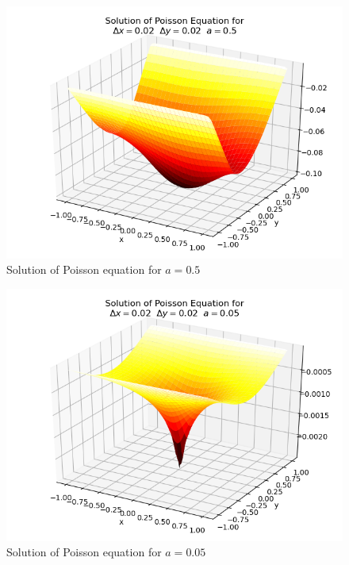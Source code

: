 \documentclass[letterpaper,12pt]{article}
\begin{document}
\paragraph{}

\begin{figure}[H]
\centerline{\includegraphics[width=\linewidth]{figures/05.png}}
\caption{Solution of Poisson equation for $a = 0.5$}
\label{fig:05}
\end{figure}
    

\begin{figure}[H]
\centerline{\includegraphics[width=\linewidth]{figures/005.png}}
\caption{Solution of Poisson equation for $a = 0.05$}
\label{fig:005}
\end{figure}
\end{document}
